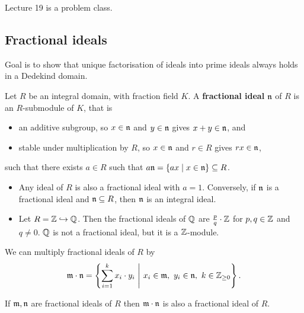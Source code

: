 
Lecture 19 is a problem class.

\pagebreak

\subsection{Fractional ideals}


Goal is to show that unique factorisation of ideals into prime ideals always holds in a Dedekind domain.

\begin{definition}
Let $ R $ be an integral domain, with fraction field $ K $. A \textbf{fractional ideal} $ \mathfrak{n} $ of $ R $ is an $ R $-submodule of $ K $, that is
\begin{itemize}
\item an additive subgroup, so $ x \in \mathfrak{n} $ and $ y \in \mathfrak{n} $ gives $ x + y \in \mathfrak{n} $, and
\item stable under multiplication by $ R $, so $ x \in \mathfrak{n} $ and $ r \in R $ gives $ rx \in \mathfrak{n} $,
\end{itemize}
such that there exists $ a \in R $ such that $ a\mathfrak{n} = \left\{ ax \mid x \in \mathfrak{n} \right\} \subseteq R $.
\end{definition}

\begin{example*}
\hfill
\begin{itemize}
\item Any ideal of $ R $ is also a fractional ideal with $ a = 1 $. Conversely, if $ \mathfrak{n} $ is a fractional ideal and $ \mathfrak{n} \subseteq R $, then $ \mathfrak{n} $ is an integral ideal.
\item Let $ R = \mathbb{Z} \hookrightarrow \mathbb{Q} $. Then the fractional ideals of $ \mathbb{Q} $ are $ \tfrac{p}{q} \cdot \mathbb{Z} $ for $ p, q \in \mathbb{Z} $ and $ q \ne 0 $. $ \mathbb{Q} $ is not a fractional ideal, but it is a $ \mathbb{Z} $-module.
\end{itemize}
\end{example*}

We can multiply fractional ideals of $ R $ by
$$ \mathfrak{m} \cdot \mathfrak{n} = \left\{ \sum_{i = 1}^k x_i \cdot y_i \ \Bigg| \ x_i \in \mathfrak{m}, \ y_i \in \mathfrak{n}, \ k \in \mathbb{Z}_{\ge 0} \right\}. $$

\begin{lemma}
If $ \mathfrak{m}, \mathfrak{n} $ are fractional ideals of $ R $ then $ \mathfrak{m} \cdot \mathfrak{n} $ is also a fractional ideal of $ R $.
\end{lemma}

